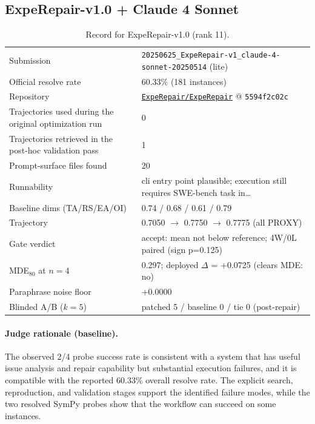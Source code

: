 \subsection{ExpeRepair-v1.0 + Claude 4 Sonnet}
\label{app:agent11}
\begin{table}[h]\centering\scriptsize
\caption{Record for ExpeRepair-v1.0 (rank 11).}
\begin{tabular}{lp{8.2cm}}\toprule
Submission & \texttt{20250625\_\allowbreak{}ExpeRepair-v1\_\allowbreak{}claude-4-sonnet-20250514} (lite) \\
Official resolve rate & 60.33\% (181 instances) \\
Repository & \href{https://github.com/ExpeRepair/ExpeRepair}{\texttt{ExpeRepair/ExpeRepair}} @ \texttt{5594f2c02c} \\
Trajectories used during the original optimization run & 0 \\
Trajectories retrieved in the post-hoc validation pass & 1 \\
Prompt-surface files found & 20 \\
Runnability & cli entry point plausible; execution still requires SWE-bench task in\ldots{} \\
Baseline dims (TA/RS/EA/OI) & 0.74 / 0.68 / 0.61 / 0.79 \\
Trajectory & 0.7050 $\to$ 0.7750 $\to$ 0.7775 (all PROXY) \\
Gate verdict & accept: mean not below reference; 4W/0L paired (sign p=0.125) \\
MDE$_{80}$ at $n{=}4$ & 0.297; deployed $\Delta$ = +0.0725 (clears MDE: no) \\
Paraphrase noise floor & +0.0000 \\
Blinded A/B ($k{=}5$) & patched 5 / baseline 0 / tie 0 (post-repair) \\
\bottomrule\end{tabular}\end{table}
\paragraph{Judge rationale (baseline).}
The observed 2/4 probe success rate is consistent with a system that has useful issue analysis and repair capability but substantial execution failures, and it is compatible with the reported 60.33\% overall resolve rate. The explicit search, reproduction, and validation stages support the identified failure modes, while the two resolved SymPy probes show that the workflow can succeed on some instances.
